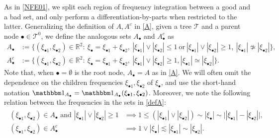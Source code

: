 \documentclass[a4paper,
11pt,  reqno]{amsart}
\newcommand{\5}{\textup{V}}
\newcommand{\noi}{\noindent}
\newcommand{\ind}{\mathbbm 1}
\newcommand{\les}{\lesssim}
\theoremstyle{remark}
\newcommand{\R}{\mathbb{R}}
\newcommand{\bul}{\bullet}
\newcommand{\TT}{\mathcal{T}}
\numberwithin{equation}{section}
\numberwithin{theorem}{section}
\begin{document}
\noi
As in \eqref{NFE01}, we split each region of frequency integration between a good and a bad set, and only perform a differentiation-by-parts when restricted to the latter. Generalizing the definition of $A, A^c$ in \eqref{A}, given a tree $\TT$ and a parent node $\bul \in \TT^0$, we define the analogous sets $A_\bul$ and $A_\bul^c$ as
\begin{align}
A_\bul&
:=
 \big\{ (\xi_{\bul1}, \xi_{\bul2}) \in \R^2: \ \xi_\bul =
\xi_{\bul1}
+ \xi_{\bul2}, \ |\xi_{\bul1}| \lor  |\xi_{\bul2}|  \le 1
\ \text{or}
\ |\xi_{\bul1}| \lor |\xi_{\bul2}| \ge 1,\
|\xi_{\bul1} | \not \simeq |\xi_{\bul2}|
 \big\} , \\
A_\bul^c & := \big\{ (\xi_{\bul1}, \xi_{\bul2}) \in \R^2: \ \xi_\bul =
\xi_{\bul1} +
\xi_{\bul2},\
|\xi_{\bul1}| \lor |\xi_{\bul2}| \ge1
 , |\xi_{\bul1} |  \simeq |\xi_{\bul2}|
\big\}
.
\label{defA}
\end{align}
Note that, when $\bul = \emptyset$ is the root node, $A_\bul =A$ as in \eqref{A}.
We will often omit the dependence on the children frequencies $\xi_{\bul 1}, \xi_{\bul2}$ of $\xi_\bul$, and use the short-hand notation $\ind_{A_\bul}=\ind_{A_\bul} (\xi_{\bul1},\xi_{\bul2})$.
Moreover, we note the following relation between the frequencies in the sets in \eqref{defA}:
\begin{align}
\label{defA2}
\begin{split}
(\xi_{\bul1}, \xi_{\bul2}) \in A_\bul \text{ and }
|\xi_{\bul1}| \lor |\xi_{\bul2}| \ge 1
&
\implies 1 \le (|\xi_{\bul1}| \lor |\xi_{\bul2}|) \sim |\xi_\bul| \sim \big| | \xi_{\bul1}| - |\xi_{\bul2}| \big|
,
\\
(\xi_{\bul1}, \xi_{\bul2}) \in A_\bul^{c}
&
\implies 1 \lor  |\xi_{\bul}|  \les |\xi_{\bul1}| \sim |\xi_{\bul2}|
.
\end{split}
\end{align}
\end{document}
